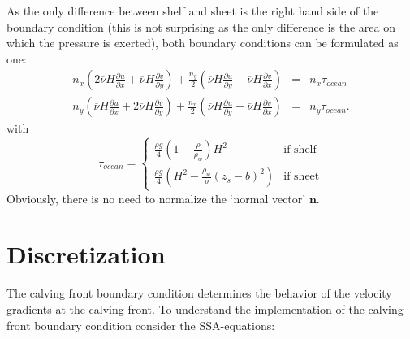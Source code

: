\documentclass[a4paper,10pt]{article}
\begin{document}
As the only difference between shelf and sheet is the right hand side of the boundary condition (this is not surprising as the only difference is the area on which the pressure is exerted), both boundary conditions can be formulated as one:
\begin{eqnarray}%
n_x\left(2\overline{\nu}H\frac{\partial u}{\partial x}+\overline{\nu}H\frac{\partial v}{\partial y}  \right) + \frac{n_y}{2} \left(\overline{\nu}H\frac{\partial u}{\partial y} + \overline{\nu}H\frac{\partial v}{\partial x} \right) & =  & n_x\tau_{ocean} \label{BC1}\\  
 n_y\left(\overline{\nu}H\frac{\partial u}{\partial x}+2\overline{\nu}H\frac{\partial v}{\partial y}  \right) + \frac{n_x}{2} \left(\overline{\nu}H\frac{\partial u}{\partial y} + \overline{\nu}H\frac{\partial v}{\partial x} \right) & = & n_y\tau_{ocean}. \label{BC2}
\end{eqnarray}
with 
\begin{equation}
\tau_{ocean} = \left\{
\begin{array}{ll}
\frac{\rho g}{4}\left(1-\frac{\rho}{\rho_w}\right)H^2 & \text{if shelf} \\
\frac{\rho g}{4}\left(H^2-\frac{\rho_w}{\rho} ( z_s-b)^2 \right) & \text{if sheet}
\end{array} \right.
\end{equation}
Obviously, there is no need to normalize the `normal vector' $\mathbf{n}$.
\section{Discretization}

\noindent The calving front boundary condition determines the behavior of the velocity gradients at the calving front. To understand the implementation of the calving front boundary condition consider the SSA-equations:
\end{document}
